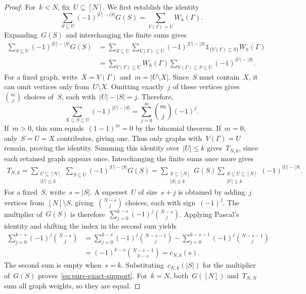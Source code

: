 \documentclass[letterpaper,11pt,reqno]{amsart}
\renewcommand{\leq}{\leqslant}
\newcommand{\ind}{\mathds{1}}
\begin{document}
\begin{proof}
For~$k<N$, fix~$U\subseteq[N]$. We first establish the identity
\begin{equation*}
\sum_{S\subseteq U}(-1)^{|U|-|S|}G(S)
=\sum_{V(\Gamma)=U}W_h(\Gamma).
\end{equation*}
Expanding~$G(S)$ and interchanging the finite sums gives
\begin{align*}
\sum_{S\subseteq U}(-1)^{|U|-|S|}G(S)
&=\sum_{S\subseteq U}\sum_{V(\Gamma)\subseteq U}
(-1)^{|U|-|S|}\ind_{\{V(\Gamma)\subseteq S\}}W_h(\Gamma)\\
&=\sum_{V(\Gamma)\subseteq U}W_h(\Gamma)
\sum_{V(\Gamma)\subseteq S\subseteq U}(-1)^{|U|-|S|}.
\end{align*}
For a fixed graph, write~$X=V(\Gamma)$ and~$m=|U\setminus X|$. Since~$S$ must contain~$X$, it can omit vertices only from~$U\setminus X$. Omitting exactly~$j$ of these vertices gives~$\binom mj$ choices of~$S$, each with~$|U|-|S|=j$. Therefore,
\begin{equation*}
\sum_{X\subseteq S\subseteq U}(-1)^{|U|-|S|}
=\sum_{j=0}^{m}\binom mj(-1)^j.
\end{equation*}
If~$m>0$, this sum equals~$(1-1)^m=0$ by the binomial theorem. If~$m=0$, only~$S=U=X$ contributes, giving one. Thus only graphs with~$V(\Gamma)=U$ remain, proving the identity. Summing this identity over~$|U|\leq k$ gives~$T_{N,k}$, since each retained graph appears once. Interchanging the finite sums once more gives
\begin{align*}
T_{N,k}
=\sum_{\substack{U\subseteq[N]\\|U|\leq k}}
\sum_{S\subseteq U}(-1)^{|U|-|S|}G(S)
=\sum_{\substack{S\subseteq[N]\\|S|\leq k}}G(S)
\sum_{\substack{S\subseteq U\subseteq[N]\\|U|\leq k}}(-1)^{|U|-|S|}.
\end{align*}
For a fixed~$S$, write~$s=|S|$. A superset~$U$ of size~$s+j$ is obtained by adding~$j$ vertices from~$[N]\setminus S$, giving~$\binom{N-s}{j}$ choices, each with sign~$(-1)^j$. The multiplier of~$G(S)$ is therefore~$\sum_{j=0}^{k-s}(-1)^j\binom{N-s}{j}$. Applying Pascal's identity and shifting the index in the second sum yields
\begin{align*}
\sum_{j=0}^{k-s}(-1)^j\binom{N-s}{j}
&=\sum_{j=0}^{k-s}(-1)^j\binom{N-s-1}{j}
-\sum_{j=0}^{k-s-1}(-1)^j\binom{N-s-1}{j}\\
&=(-1)^{k-s}\binom{N-s-1}{k-s}
=c_{N,k}(s).
\end{align*}
The second sum is empty when~$s=k$. Substituting~$c_{N,k}(|S|)$ for the multiplier of~$G(S)$ proves~\eqref{eq:pure-exact-support}. For~$k=N$, both~$G([N])$ and~$T_{N,N}$ sum all graph weights, so they are equal.


\end{proof}
\end{document}
